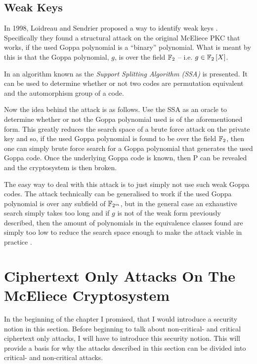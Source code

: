 \subsection{Weak Keys}
\label{subsec:weakKeys}

In 1998, Loidreau and Sendrier proposed a way to identify weak keys \cite{LS}. Specifically they found a structural attack on the original McEliece PKC that works, if the used Goppa polynomial is a ``binary'' polynomial. What is meant by this is that the Goppa polynomial, $g$, is over the field $\mathbb{F}_2$ -- i.e. $g \in \mathbb{F}_2\left[X\right]$.

In \cite{sendrier} an algorithm known as the \emph{Support Splitting Algorithm (SSA)} is presented. It can be used to determine whether or not two codes are permutation equivalent and the automorphism group of a code.

Now the idea behind the attack is as follows. Use the SSA as an oracle to determine whether or not the Goppa polynomial used is of the aforementioned form. This greatly reduces the search space of a brute force attack on the private key and so, if the used Goppa polynomial is found to be over the field $\mathbb{F}_2$, then one can simply brute force search for a Goppa polynomial that generates the used Goppa code. Once the underlying Goppa code is known, then $\mathrm{P}$ can be revealed and the cryptosystem is then broken.

The easy way to deal with this attack is to just simply not use such weak Goppa codes. The attack technically can be generalised to work if the used Goppa polynomial is over any subfield of $\mathbb{F}_{2^m}$, but in the general case an exhaustive search simply takes too long and if $g$ is not of the weak form previously described, then the amount of polynomials in the equivalence classes found are simply too low to reduce the search space enough to make the attack viable in practice \cite{EOS,KI}.



\section{Ciphertext Only Attacks On The McEliece Cryptosystem}
\label{sec:cipOnlAttMceCry}

In the beginning of the chapter I promised, that I would introduce a security notion in this section. Before beginning to talk about non-critical- and critical ciphertext only attacks, I will have to introduce this security notion. This will provide a basis for why the attacks described in this section can be divided into critical- and non-critical attacks.

